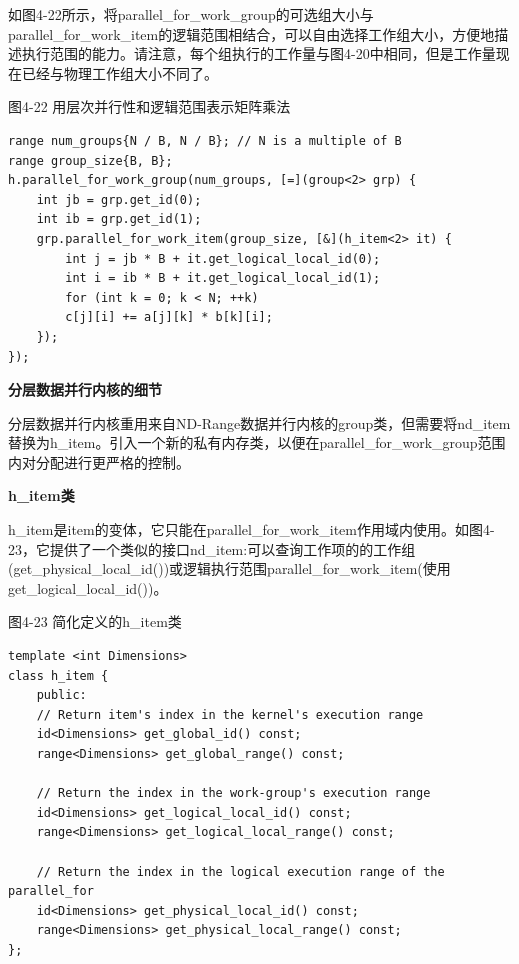 如图4-22所示，将parallel\_for\_work\_group的可选组大小与parallel\_for\_work\_item的逻辑范围相结合，可以自由选择工作组大小，方便地描述执行范围的能力。请注意，每个组执行的工作量与图4-20中相同，但是工作量现在已经与物理工作组大小不同了。\par

\hspace*{\fill} \par %
图4-22 用层次并行性和逻辑范围表示矩阵乘法
\begin{lstlisting}[caption={}]
range num_groups{N / B, N / B}; // N is a multiple of B
range group_size{B, B};
h.parallel_for_work_group(num_groups, [=](group<2> grp) {
	int jb = grp.get_id(0);
	int ib = grp.get_id(1);
	grp.parallel_for_work_item(group_size, [&](h_item<2> it) {
		int j = jb * B + it.get_logical_local_id(0);
		int i = ib * B + it.get_logical_local_id(1);
		for (int k = 0; k < N; ++k)
		c[j][i] += a[j][k] * b[k][i];
	});
});
\end{lstlisting}

\hspace*{\fill} \par %
\textbf{分层数据并行内核的细节}

分层数据并行内核重用来自ND-Range数据并行内核的group类，但需要将nd\_item替换为h\_item。引入一个新的私有内存类，以便在parallel\_for\_work\_group范围内对分配进行更严格的控制。\par

\hspace*{\fill} \par %
\textbf{h\_item类}

h\_item是item的变体，它只能在parallel\_for\_work\_item作用域内使用。如图4-23，它提供了一个类似的接口nd\_item:可以查询工作项的的工作组(get\_physical\_local\_id())或逻辑执行范围parallel\_for\_work\_item(使用get\_logical\_local\_id())。\par

\hspace*{\fill} \par %
图4-23 简化定义的h\_item类
\begin{lstlisting}[caption={}]
template <int Dimensions>
class h_item {
	public:
	// Return item's index in the kernel's execution range
	id<Dimensions> get_global_id() const;
	range<Dimensions> get_global_range() const;
	
	// Return the index in the work-group's execution range
	id<Dimensions> get_logical_local_id() const;
	range<Dimensions> get_logical_local_range() const;
	
	// Return the index in the logical execution range of the parallel_for
	id<Dimensions> get_physical_local_id() const;
	range<Dimensions> get_physical_local_range() const;
};
\end{lstlisting}

